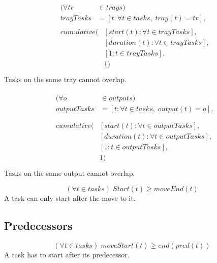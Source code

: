  \begin{equation}
 \begin{aligned}\label{eq:105}
 &\begin{aligned}
 (\forall tr &\in trays) \\
 trayTasks &= [t : \forall t \in tasks, \; tray(t) = tr], 
 \end{aligned}\\
 &\begin{aligned}
 cumulative(&[start(t) : \forall t \in trayTasks],\\
 &[duration(t) : \forall t \in trayTasks],\\
 &[1 : t \in trayTasks],\\
 &1)
 \end{aligned}\\
 \end{aligned}
 \end{equation}
 Tasks on the same tray cannot overlap.
 
 \begin{equation}
 \begin{aligned}\label{eq:106}
 &\begin{aligned}
 (\forall o &\in outputs) \\
 outputTasks &= [t : \forall t \in tasks, \; output(t) = o], \\
 \end{aligned}\\
 &\begin{aligned}
 cumulative(&[start(t) : \forall t \in outputTasks], \\
 &[duration(t) : \forall t \in outputTasks], \\
 &[1 : t \in outputTasks], \\
 &1)
 \end{aligned}\\
 \end{aligned}
 \end{equation}
 Tasks on the same output cannot overlap.
 
 \begin{equation}\label{eq:107}
 (\forall t \in tasks) \; Start(t) \geq moveEnd(t)\end{equation}
 A task can only start after the move to it.
 
 \subsection{Predecessors}
 
 \begin{equation}\label{eq:108}
 (\forall t \in tasks) \; moveStart(t) \geq end(pred(t))\end{equation}
 A task has to start after its predecessor.
 
